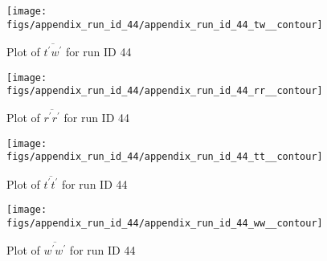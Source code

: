 \begin{figure}[H]
\centering
\texttt{[image: figs/appendix\_run\_id\_44/appendix\_run\_id\_44\_tw\_\_contour]}
\caption{Plot of $\overline{t^\prime w^\prime}$ for run ID 44}
\label{fig:appendix_run_id_44_tw__contour}
\end{figure}


\begin{figure}[H]
\centering
\texttt{[image: figs/appendix\_run\_id\_44/appendix\_run\_id\_44\_rr\_\_contour]}
\caption{Plot of $\overline{r^\prime r^\prime}$ for run ID 44}
\label{fig:appendix_run_id_44_rr__contour}
\end{figure}


\begin{figure}[H]
\centering
\texttt{[image: figs/appendix\_run\_id\_44/appendix\_run\_id\_44\_tt\_\_contour]}
\caption{Plot of $\overline{t^\prime t^\prime}$ for run ID 44}
\label{fig:appendix_run_id_44_tt__contour}
\end{figure}


\begin{figure}[H]
\centering
\texttt{[image: figs/appendix\_run\_id\_44/appendix\_run\_id\_44\_ww\_\_contour]}
\caption{Plot of $\overline{w^\prime w^\prime}$ for run ID 44}
\label{fig:appendix_run_id_44_ww__contour}
\end{figure}


